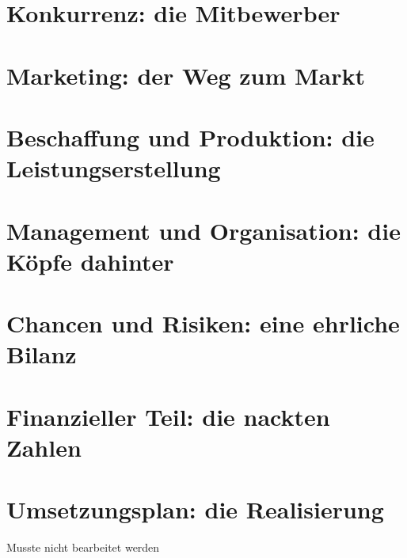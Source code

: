 \section{Konkurrenz: die Mitbewerber}

\section{Marketing: der Weg zum Markt}

\section{Beschaffung und Produktion: die Leistungserstellung}

\section{Management und Organisation: die Köpfe dahinter}

\section{Chancen und Risiken: eine ehrliche Bilanz}

\section{Finanzieller Teil: die nackten Zahlen}


\section{Umsetzungsplan: die Realisierung}
Musste nicht bearbeitet werden

